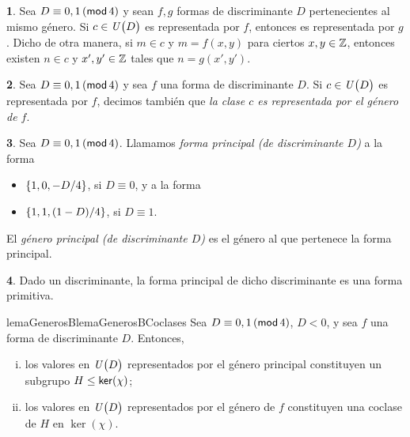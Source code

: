 \theoremstyle{plain}
\newtheorem{teoGenerosB}{\teoname}[section]
\newtheorem{lemaGenerosB}[teoGenerosB]{\lemaname}
\newtheorem{coroGenerosB}[teoGenerosB]{\coroname}

\theoremstyle{definition}
\newtheorem{obsGenerosB}[teoGenerosB]{\obsname}
\newtheorem{defGenerosB}[teoGenerosB]{}


\begin{obsGenerosB}\label{obs:generos:representacion}
	Sea $D\equiv 0,1\tmodulo[4]$ y sean $f,g$ formas
	de discriminante $D$ pertenecientes al mismo g\'enero.
	Si $c\in\Unidadesmod[D]$ es representada por $f$, entonces
	es representada por $g$. Dicho de otra manera, si
	$m\in c$ y $m=f(x,y)$ para ciertos $x,y\in\Enteros$, entonces
	existen $n\in c$ y $x',y'\in\Enteros$ tales que
	$n=g(x',y')$.
\end{obsGenerosB}

\begin{defGenerosB}\label{def:generos:representacion}
	Sea $D\equiv 0,1\tmodulo[4]$ y sea $f$ una forma
	de discriminante $D$. Si $c\in\Unidadesmod[D]$ es
	representada por $f$, decimos tambi\'en que
	\emph{la clase $c$ es representada por el g\'enero de $f$}.
\end{defGenerosB}

\begin{defGenerosB}\label{def:generos:principal}
	Sea $D\equiv 0,1\tmodulo[4]$. Llamamos
	\emph{forma principal (de discriminante $D$)} a la forma
	\begin{itemize}
		\item $\binaria{1,0,-D/4}$, si $D\equiv 0$, y a la forma
		\item $\binaria{1,1,(1-D)/4}$, si $D\equiv 1$.
	\end{itemize}
	El \emph{g\'enero principal (de discriminante $D$)} es el
	g\'enero al que pertenece la forma principal.
\end{defGenerosB}

\begin{obsGenerosB}\label{obs:generos:principal}
	Dado un discriminante, la forma principal de dicho discriminante
	es una forma primitiva.
\end{obsGenerosB}

\begin{restatable}{lemaGenerosB}{lemaGenerosBCoclases}
	\label{lema:generos}
	Sea $D\equiv 0,1\tmodulo[4]$, $D<0$, y sea $f$ una forma
	de discriminante $D$. Entonces,
	\begin{enumerate}[(i)]
		\item\label{item:lema:generos:principal}
			los valores en $\Unidadesmod[D]$ representados por
			el g\'enero principal constituyen un subgrupo
			$H\subgrpeq\ker(\chi)$;
		\item\label{item:lema:generos:coclases}
			los valores en $\Unidadesmod[D]$ representados por
			el g\'enero de $f$ constituyen una coclase de $H$
			en $\ker(\chi)$.
	\end{enumerate}
\end{restatable}

